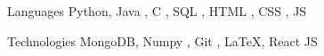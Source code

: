 
\begin{cvskills}
  \cvskill
    {Languages} %
    {Python, Java , C , SQL , HTML , CSS , JS } %

  \cvskill
    {Technologies} %
    {MongoDB, Numpy , Git , LaTeX, React JS } %
\end{cvskills}
